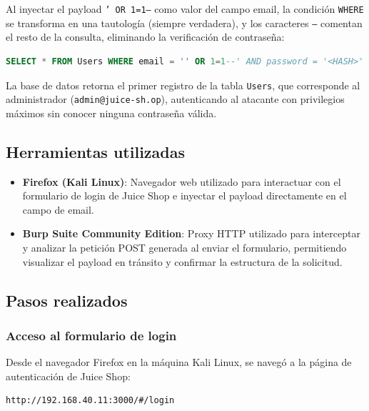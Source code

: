 \documentclass[12pt, letterpaper]{article}
\begin{document}
Al inyectar el payload \texttt{' OR 1=1--} como valor del campo email, la condición \texttt{WHERE} se transforma en una tautología (siempre verdadera), y los caracteres \texttt{--} comentan el resto de la consulta, eliminando la verificación de contraseña:

\begin{lstlisting}[language=SQL, caption={Consulta SQL resultante tras la inyección del payload}]
SELECT * FROM Users WHERE email = '' OR 1=1--' AND password = '<HASH>'
\end{lstlisting}

La base de datos retorna el primer registro de la tabla \texttt{Users}, que corresponde al administrador (\texttt{admin@juice-sh.op}), autenticando al atacante con privilegios máximos sin conocer ninguna contraseña válida.

\subsection{Herramientas utilizadas}

\begin{itemize}
  \item \textbf{Firefox (Kali Linux)}: Navegador web utilizado para interactuar con el formulario de login de Juice Shop e inyectar el payload directamente en el campo de email.
  \item \textbf{Burp Suite Community Edition}: Proxy HTTP utilizado para interceptar y analizar la petición POST generada al enviar el formulario, permitiendo visualizar el payload en tránsito y confirmar la estructura de la solicitud.
\end{itemize}

\subsection{Pasos realizados}

\subsubsection{Acceso al formulario de login}

Desde el navegador Firefox en la máquina Kali Linux, se navegó a la página de autenticación de Juice Shop:

\begin{lstlisting}[language=bash, caption={URL del formulario de login de Juice Shop}]
http://192.168.40.11:3000/#/login
\end{lstlisting}
\end{document}

